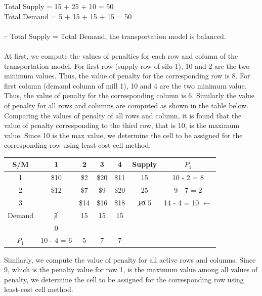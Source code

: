 Total Supply = 15 + 25 + 10 = 50\\
Total Demand = 5 + 15 + 15 + 15 = 50\\\\
$\because$ Total Supply = Total Demand, the transportation model is balanced.\\\\
At first, we compute the values of penalties for each row and column of the transportation model. For first row (supply row of silo 1), 10 and 2 are the two minimum values. Thus, the value of penalty for the corresponding row is 8. For first column (demand column of mill 1), 10 and 4 are the two minimum value. Thus, the value of penalty for the corresponding column is 6. Similarly the value of penalty for all rows and columns are computed as shown in the table below. Comparing the values of penalty of all rows and column, it is found that the value of penalty corresponding to the third row, that is 10, is the maximum value. Since 10 is the max value, we determine the cell to be assigned for the corresponding row using least-cost cell method.
\begin{center}
	\begin{tabular}{c | c | c | c | c | c | c}
		S/M & 1 & 2 & 3 & 4 & Supply & $P_1$ \\
		\hline
		1 & \$10 \cellcolor[gray]{0.8} & \$2 & \$20 & \$11 & 15 & 10 - 2 = 8\\
		\hline
		2 & \$12 \cellcolor[gray]{0.8} & \$7 & \$9 & \$20 & 25 & 9 - 7 = 2\\
		\hline
		3 & \innerbox{\$4}{5} \cellcolor[gray]{0.8} & \$14 & \$16 & \$18 & $ \cancel{10} $ 5 & 14 - 4 = 10 $\leftarrow$\\
		\hline
		Demand & $ \cancel{5} $ & 15 & 15 & 15 & & \\
		 & $ 0 $ &  &  &  & & \\
		 \hline
		 $P_1$ & 10 - 4 = 6 & 5 & 7 & 7 & & \\
	\end{tabular}
\end{center}
Similarly, we compute the value of penalty for all active rows and columns. Since 9, which is the penalty value for row 1, is the maximum value among all values of penalty, we determine the cell to be assigned for the corresponding row using least-cost cell method.
